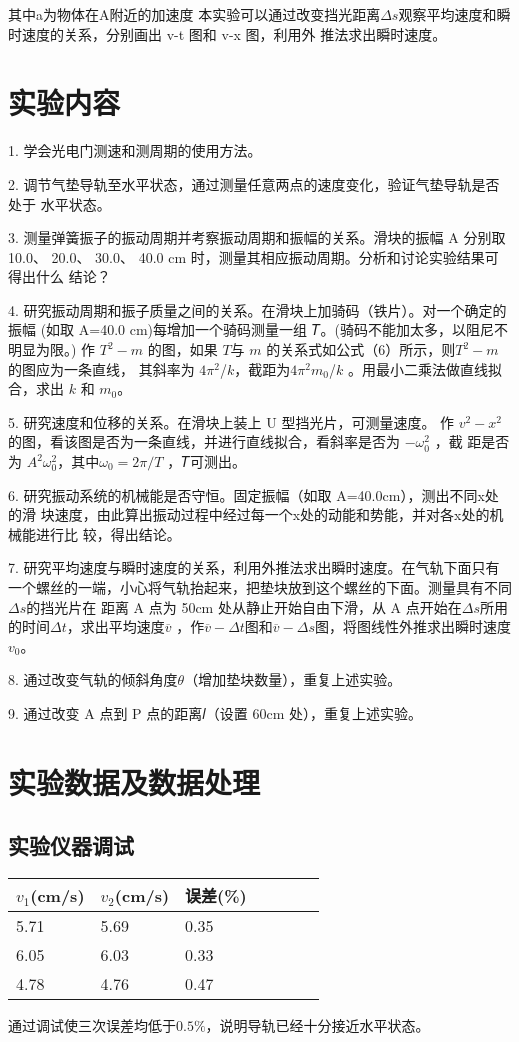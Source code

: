 \documentclass[11pt,a4paper]{article}
\begin{document}
    其中a为物体在A附近的加速度
    本实验可以通过改变挡光距离$\Delta s$观察平均速度和瞬时速度的关系，分别画出 v-t 图和 v-x 图，利用外
    推法求出瞬时速度。

\section{实验内容}
    
1. 学会光电门测速和测周期的使用方法。

2. 调节气垫导轨至水平状态，通过测量任意两点的速度变化，验证气垫导轨是否处于
水平状态。

3. 测量弹簧振子的振动周期并考察振动周期和振幅的关系。滑块的振幅 A 分别取
10.0、 20.0、 30.0、 40.0 cm 时，测量其相应振动周期。分析和讨论实验结果可得出什么
结论？ 

4. 研究振动周期和振子质量之间的关系。在滑块上加骑码（铁片）。对一个确定的振幅
(如取 A=40.0 cm)每增加一个骑码测量一组 𝑇。(骑码不能加太多，以阻尼不明显为限。) 
作 $T^2-m$ 的图，如果 $T$与 $m$ 的关系式如公式（6）所示，则$T^2-m$ 的图应为一条直线，
其斜率为 $4$$\pi^2$/$k$，截距为$4$$\pi^2$$m_0$/$k$ 。用最小二乘法做直线拟合，求出 $k$ 和 $m_0$。

5. 研究速度和位移的关系。在滑块上装上 U 型挡光片，可测量速度。
作 $v^2-x^2$的图，看该图是否为一条直线，并进行直线拟合，看斜率是否为 $-\omega_0^2$ ，截
距是否为 $A^2$$\omega_0^2$，其中$\omega_0=2\pi /T $ ，𝑇可测出。

6. 研究振动系统的机械能是否守恒。固定振幅（如取 A=40.0cm），测出不同x处的滑
块速度，由此算出振动过程中经过每一个x处的动能和势能，并对各x处的机械能进行比
较，得出结论。

7. 研究平均速度与瞬时速度的关系，利用外推法求出瞬时速度。在气轨下面只有一个螺丝的一端，小心将气轨抬起来，把垫块放到这个螺丝的下面。测量具有不同$\Delta s$的挡光片在
距离 A 点为 50cm 处从静止开始自由下滑，从 A 点开始在$\Delta s$所用的时间$\Delta t$，求出平均速度$\overline{v}$ ，作$\overline{v}-\Delta t$图和$\overline{v}-\Delta s $图，将图线性外推求出瞬时速度$v_0$。

8. 通过改变气轨的倾斜角度$\theta $（增加垫块数量），重复上述实验。

9. 通过改变 A 点到 P 点的距离𝑙（设置 60cm 处），重复上述实验。
\section{实验数据及数据处理}
    \subsection{实验仪器调试}
    \begin{table}[H]
        \centering
        \begin{tabular}{|l|l|l|l|l|l|l|}
        \hline
            $v_1$(cm/s) & $v_2$(cm/s) & 误差(\%) \\ \hline
            5.71 & 5.69 & 0.35 \\ \hline
            6.05 & 6.03 & 0.33 \\ \hline
            4.78 & 4.76 & 0.47 \\ \hline
        \end{tabular}
    \end{table}
    通过调试使三次误差均低于$0.5\%$，说明导轨已经十分接近水平状态。
\end{document}
